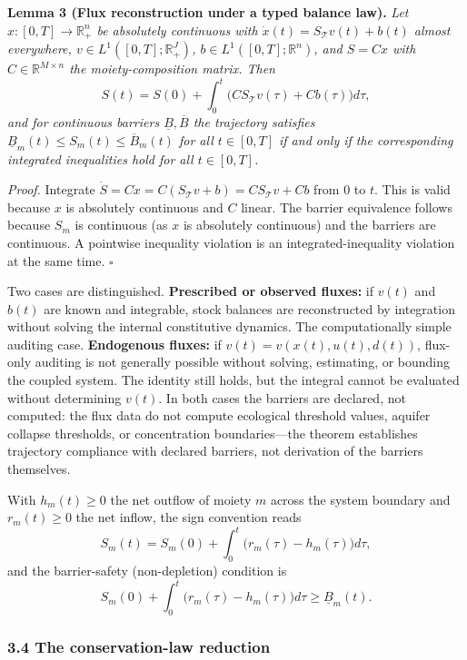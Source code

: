 \documentclass[11pt]{article}
\begin{document}
\textbf{Lemma 3 (Flux reconstruction under a typed balance law).}
\emph{Let \(x : [0,T] \to \mathbb{R}_+^n\) be absolutely continuous with
\(\dot x(t) = S_{\mathcal{T}} v(t) + b(t)\) almost everywhere,
\(v \in L^1([0,T]; \mathbb{R}_+^J)\),
\(b \in L^1([0,T]; \mathbb{R}^n)\), and \(S = Cx\) with
\(C \in \mathbb{R}^{M \times n}\) the moiety-composition matrix. Then}
\[S(t) = S(0) + \int_0^t \bigl( C S_{\mathcal{T}} v(\tau) + Cb(\tau) \bigr) d\tau,\]
\emph{and for continuous barriers \(\underline{B}, \overline{B}\) the
trajectory satisfies
\(\underline{B}_m(t) \le S_m(t) \le \overline{B}_m(t)\) for all
\(t \in [0,T]\) if and only if the corresponding integrated inequalities
hold for all \(t \in [0,T]\).}

\emph{Proof.} Integrate \(\dot S = C\dot x = C(S_{\mathcal{T}} v + b) = C S_{\mathcal{T}} v + Cb\) from \(0\) to \(t\). This is valid because \(x\) is absolutely continuous and \(C\) linear. The barrier equivalence follows because \(S_m\) is continuous (as \(x\) is absolutely continuous) and the barriers are continuous. A pointwise inequality violation is an integrated-inequality violation at the same time. \ensuremath{\square}

Two cases are distinguished. \textbf{Prescribed or observed fluxes:} if \(v(t)\) and \(b(t)\) are known and integrable, stock balances are reconstructed by integration without solving the internal constitutive dynamics. The computationally simple auditing case. \textbf{Endogenous fluxes:} if \(v(t) = v(x(t), u(t), d(t))\), flux-only auditing is not generally possible without solving, estimating, or bounding the coupled system. The identity still holds, but the integral cannot be evaluated without determining \(v(t)\). In both cases the barriers are declared, not computed: the flux data do not compute ecological threshold values, aquifer collapse thresholds, or concentration boundaries---the theorem establishes trajectory compliance with declared barriers, not derivation of the barriers themselves.

With \(h_m(t) \ge 0\) the net outflow of moiety \(m\) across the system
boundary and \(r_m(t) \ge 0\) the net inflow, the sign convention reads
\[S_m(t) = S_m(0) + \int_0^t \bigl( r_m(\tau) - h_m(\tau) \bigr) d\tau,\]
and the barrier-safety (non-depletion) condition is
\[S_m(0) + \int_0^t \bigl( r_m(\tau) - h_m(\tau) \bigr) d\tau \ge \underline{B}_m(t).\]

\subsubsection{3.4 The conservation-law
reduction}\label{the-conservation-law-reduction}
\end{document}
